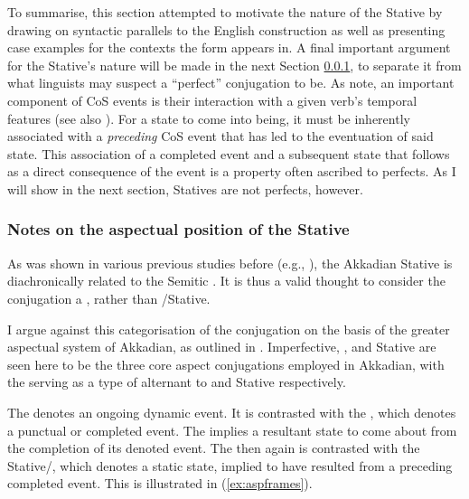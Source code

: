\documentclass[output=paper,colorlinks,citecolor=brown]{langscibook}
\begin{document}
To summarise, this section attempted to motivate the  nature of the Stative by drawing on syntactic parallels to the English  construction as well as presenting case examples for the  contexts the form appears in. A final important argument for the Stative's  nature will be made in the next Section \ref{sec:notesonasp}, to separate it from what linguists may suspect a “perfect” conjugation to be. As \citet[3]{Beaversetal2021} note, an important component of CoS  events is their interaction with a given verb's temporal features (see also \cite{Hay1999,KennedyLevin2008,beavers_lexical_2012}). For a  state to come into being, it must be inherently associated with a \textit{preceding} CoS  event that has led to the eventuation of said  state. This association of a completed event and a subsequent state that follows as a direct consequence of the event is a property often ascribed to perfects. As I will show in the next section, Statives are not perfects, however.


\subsubsection{Notes on the aspectual position of the Stative}\label{sec:notesonasp}

As was shown in various previous studies before (e.g., \cite{cohen_phrase_1984}), the Akkadian Stative is diachronically related to the Semitic . It is thus a valid thought to consider the conjugation a , rather than /Stative.

I argue against this categorisation of the conjugation on the basis of the greater aspectual system of Akkadian, as outlined in \citet{kamil_phD,kamil_once_inprep}. Imperfective, , and Stative are seen here to be the three core aspect conjugations employed in Akkadian, with the  serving as a type of alternant to  and Stative respectively.

The  denotes an ongoing dynamic event. It is contrasted with the , which denotes a punctual or completed event. The  implies a resultant state to come about from the completion of its denoted event. The  then again is contrasted with the Stative/, which denotes a static state, implied to have resulted from a preceding completed event. This is illustrated in (\ref{ex:aspframes}).
\end{document}
